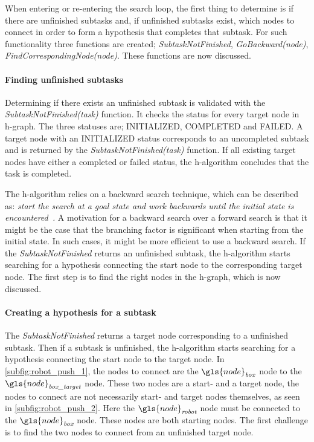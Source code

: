 When entering or re-entering the search loop, the first thing to determine is if there are unfinished subtasks and, if unfinished subtasks exist, which nodes to connect in order to form a hypothesis that completes that subtask. For such functionality three functions are created; \textit{SubtaskNotFinished}, \textit{GoBackward(\gls{node})}, \textit{FindCorrespondingNode(\gls{node})}. These functions are now discussed.\bs

\paragraph{Finding unfinished subtasks}
Determining if there exists an unfinished subtask is validated with the \textit{SubtaskNotFinished(\gls{task})} function. It checks the status for every target node in \ac{h-graph}. The three statuses are; INITIALIZED, COMPLETED and FAILED. A target node with an INITIALIZED status corresponds to an uncompleted subtask and is returned by the \textit{SubtaskNotFinished(\gls{task})} function. If all existing target nodes have either a completed or failed status, the \ac{h-algorithm} concludes that the task is completed.\bs

The \ac{h-algorithm} relies on a backward search technique, which can be described as: \textit{start the search at a goal state and work backwards until the initial state is encountered~\cite{lavalle_planning_2006}.} A motivation for a backward search over a forward search is that it might be the case that the branching factor is significant when starting from the initial state. In such cases, it might be more efficient to use a backward search. If the \textit{SubtaskNotFinished} returns an unfinished subtask, the \ac{h-algorithm} starts searching for a hypothesis connecting the start node to the corresponding target node. The first step is to find the right nodes in the \ac{h-graph}, which is now discussed.\bs

\paragraph{Creating a hypothesis for a subtask}
The \textit{SubtaskNotFinished} returns a target node corresponding to a unfinished subtask. Then if a subtask is unfinished, the \ac{h-algorithm} starts searching for a hypothesis connecting the start node to the target node. In \cref{subfig:robot_push_1}, the nodes to connect are the $\gls{node}_\mathit{box}$ node to the $\gls{node}_\textit{box\_target}$ node. These two nodes are a start- and a target node, the nodes to connect are not necessarily start- and target nodes themselves, as seen in \cref{subfig:robot_push_2}. Here the $\gls{node}_\textit{robot}$ node must be connected to the $\gls{node}_\textit{box}$ node. These nodes are both starting nodes. The first challenge is to find the two nodes to connect from an unfinished target node.\bs

